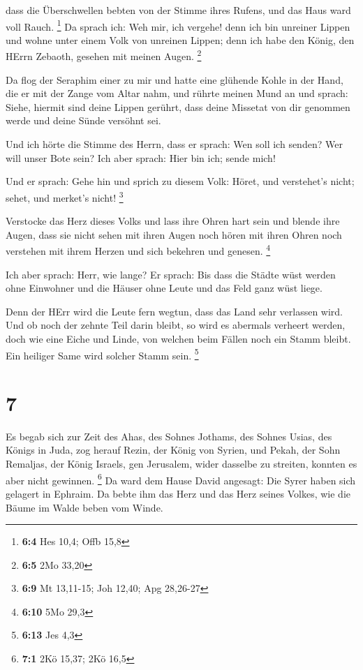  dass die Überschwellen bebten von der Stimme ihres Rufens,
und das Haus ward voll Rauch. \footnote{\textbf{6:4} Hes 10,4; Offb 15,8}
 Da sprach ich: Weh mir, ich vergehe! denn ich bin unreiner
Lippen und wohne unter einem Volk von unreinen Lippen; denn ich habe den
König, den HErrn Zebaoth, gesehen mit meinen Augen. \footnote{\textbf{6:5}
  2Mo 33,20}

 Da flog der Seraphim einer zu mir und hatte eine glühende
Kohle in der Hand, die er mit der Zange vom Altar nahm,  und
rührte meinen Mund an und sprach: Siehe, hiermit sind deine Lippen
gerührt, dass deine Missetat von dir genommen werde und deine Sünde
versöhnt sei.

 Und ich hörte die Stimme des Herrn, dass er sprach: Wen
soll ich senden? Wer will unser Bote sein? Ich aber sprach: Hier bin
ich; sende mich!

 Und er sprach: Gehe hin und sprich zu diesem Volk: Höret,
und verstehet's nicht; sehet, und merket's nicht! \footnote{\textbf{6:9}
  Mt 13,11-15; Joh 12,40; Apg 28,26-27}

 Verstocke das Herz dieses Volks und lass ihre Ohren hart
sein und blende ihre Augen, dass sie nicht sehen mit ihren Augen noch
hören mit ihren Ohren noch verstehen mit ihrem Herzen und sich bekehren
und genesen. \footnote{\textbf{6:10} 5Mo 29,3}

 Ich aber sprach: Herr, wie lange? Er sprach: Bis dass die
Städte wüst werden ohne Einwohner und die Häuser ohne Leute und das Feld
ganz wüst liege.

 Denn der HErr wird die Leute fern wegtun, dass das Land
sehr verlassen wird.  Und ob noch der zehnte Teil darin
bleibt, so wird es abermals verheert werden, doch wie eine Eiche und
Linde, von welchen beim Fällen noch ein Stamm bleibt. Ein heiliger Same
wird solcher Stamm sein. \footnote{\textbf{6:13} Jes 4,3}

\hypertarget{section-3}{%
\section{7}\label{section-3}}

 Es begab sich zur Zeit des Ahas, des Sohnes Jothams, des
Sohnes Usias, des Königs in Juda, zog herauf Rezin, der König von
Syrien, und Pekah, der Sohn Remaljas, der König Israels, gen Jerusalem,
wider dasselbe zu streiten, konnten es aber nicht gewinnen. \footnote{\textbf{7:1}
  2Kö 15,37; 2Kö 16,5}  Da ward dem Hause David angesagt:
Die Syrer haben sich gelagert in Ephraim. Da bebte ihm das Herz und das
Herz seines Volkes, wie die Bäume im Walde beben vom Winde.

